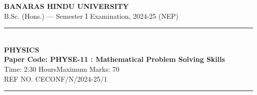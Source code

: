 \documentclass[11pt,a4paper]{article}
\begin{document}
\begin{center}
  {\large\bfseries BANARAS HINDU UNIVERSITY}\\[2pt]
  {\normalsize B.Sc. (Hons.) --- Semester I Examination, 2024-25 (NEP)}\\[6pt]
  \rule{0.8\linewidth}{0.5pt}\\[6pt]
  {\large\bfseries PHYSICS}\\[4pt]
  {\large\bfseries Paper Code: PHYSE-11 : Mathematical Problem Solving Skills}\\[4pt]
  {\normalsize Time: 2:30 Hours\hfill Maximum Marks: 70}\\[2pt]
  {\small REF NO. CECONF/N/2024-25/1}
\end{center}

\rule{\linewidth}{0.4pt}

\smallskip
\end{document}

